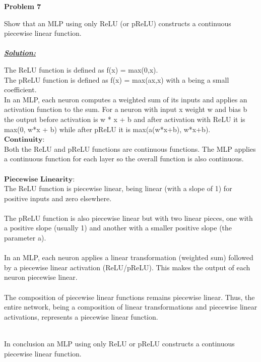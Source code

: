 \documentclass{article}
\begin{document}
\newpage
\noindent \textbf{Problem 7}

\noindent Show that an MLP using only ReLU (or pReLU) constructs a continuous piecewise linear function. \\ \\

\noindent \underline{\textbf{\textit{Solution:}}}  

\noindent The ReLU function is defined as f(x) = max(0,x).\\
The pReLU function is defined as f(x) = max(ax,x) with a being a small coefficient.\\
In an MLP, each neuron computes a weighted sum of its inputs and applies an activation function to the sum. For a neuron 
with input x weight w and bias b the output before activation is w * x + b and after activation with ReLU it is max(0, w*x + b) while after pReLU it is max(a(w*x+b), w*x+b). \\

\noindent$\bm{Continuity:} $\\
Both the ReLU and pReLU functions are continuous functions. The MLP applies a continuous function for each layer so the overall function is also continuous.\\\\

\noindent$\bm{Piecewise}$ $ \bm{Linearity:} $\\
The ReLU function is piecewise linear, being linear (with a slope of 1) for positive inputs and zero elsewhere. \\\\
The pReLU function is also piecewise linear but with two linear pieces, one with a positive slope (usually 1) and another with a smaller positive slope (the parameter a). \\\\
In an MLP, each neuron applies a linear transformation (weighted sum) followed by a piecewise linear activation (ReLU/pReLU). This makes the output of each neuron piecewise linear. \\\\
The composition of piecewise linear functions remains piecewise linear. Thus, the entire network, being a composition of linear transformations and piecewise linear activations, represents a piecewise linear function.

\noindent \\In conclusion an MLP using only ReLU or pReLU constructs a continuous piecewise linear function.
\end{document}
